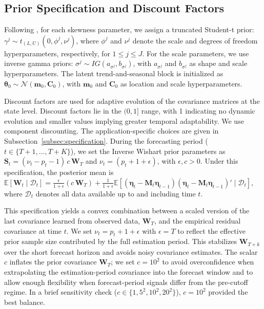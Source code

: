 \documentclass[APA,STIX1COL]{WileyNJD-v2}
\begin{document}
\subsection{Prior Specification and Discount Factors}
\label{subsec:prioranddisc}
Following \citet{barata2021_flex_quantile}, for each skewness parameter, we assign a truncated Student-t prior: \(\gamma^j \sim t_{(L, U)}(0, \phi^j, \nu^j)\), where $\phi^j$ and $\nu^j$ denote the scale and degrees of freedom hyperparameters, respectively, for \(1 \leq j \leq J\). For the scale parameters, we use inverse gamma priors: \(\sigma^j \sim IG(a_{\sigma^j}, b_{\sigma^j})\), with $a_{\sigma^j}$ and $b_{\sigma^j}$ as shape and scale hyperparameters. The latent trend-and-seasonal block is initialized as \(\boldsymbol{\theta}_0 \sim \mathcal{N}(\mathbf{m}_0, \mathbf{C}_0)\), with $\mathbf{m}_0$ and $\mathbf{C}_0$ as location and scale hyperparameters.

Discount factors \citep{prado2021time} are used for adaptive evolution of the covariance matrices at the state level. Discount factors lie in the $(0,1]$ range, with 1 indicating no dynamic evolution and smaller values implying greater temporal adaptability. We use component discounting. The application-specific choices are given in Subsection~\ref{subsec:specification}. During the forecasting period ($t \in \{T+1, \ldots, T+K\}$), we set the Inverse Wishart prior parameters as $\mathbf{S}_t = (\nu_t - p_t - 1)\, c\, \mathbf{W}_T$ and $\nu_t = (p_t + 1 + \epsilon)$, with $\epsilon, c > 0$. Under this specification, the posterior mean is
\(
\mathbb{E}[\mathbf{W}_t \mid \mathcal{D}_t] = \frac{\epsilon}{1 + \epsilon}(c\, \mathbf{W}_T) + \frac{1}{1 + \epsilon} \mathbb{E}\left[ (\boldsymbol{\eta}_t - \mathbf{M}_t \boldsymbol{\eta}_{t-1}) (\boldsymbol{\eta}_t - \mathbf{M}_t \boldsymbol{\eta}_{t-1})' \mid \mathcal{D}_t \right],
\)
where $\mathcal{D}_t$ denotes all data available up to and including time $t$.

This specification yields a convex combination between a scaled version of the last covariance learned from observed data, $\mathbf{W}_T$, and the empirical residual covariance at time $t$. We set $\nu_t = p_t + 1 + \epsilon$ with $\epsilon = T$ to reflect the effective prior sample size contributed by the full estimation period. This stabilizes $\mathbf{W}_{T+k}$ over the short forecast horizon and avoids noisy covariance estimates. The scalar \(c\) inflates the prior covariance \(\mathbf{W}_T\); we set \(c = 10^2\) to avoid overconfidence when extrapolating the estimation-period covariance into the forecast window and to allow enough flexibility when forecast-period signals differ from the pre-cutoff regime. In a brief sensitivity check (\(c \in \{1,5^2,10^2,20^2\}\)), \(c=10^2\) provided the best balance.
 
\end{document}
